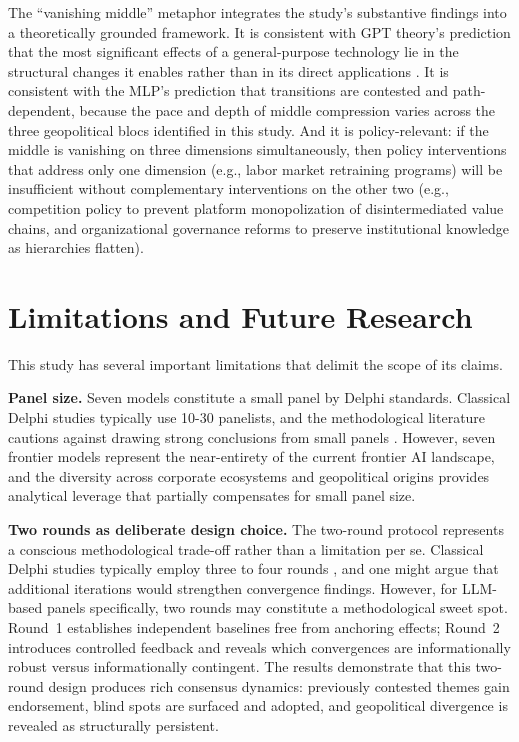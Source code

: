\documentclass[preprint,review,12pt]{elsarticle}
\begin{document}
The ``vanishing middle'' metaphor integrates the study's substantive findings into a theoretically grounded framework. It is consistent with GPT theory's prediction that the most significant effects of a general-purpose technology lie in the structural changes it enables rather than in its direct applications \citep{bresnahan1995gpt}. It is consistent with the MLP's prediction that transitions are contested and path-dependent, because the pace and depth of middle compression varies across the three geopolitical blocs identified in this study. And it is policy-relevant: if the middle is vanishing on three dimensions simultaneously, then policy interventions that address only one dimension (e.g., labor market retraining programs) will be insufficient without complementary interventions on the other two (e.g., competition policy to prevent platform monopolization of disintermediated value chains, and organizational governance reforms to preserve institutional knowledge as hierarchies flatten).



\section{Limitations and Future Research}
\label{sec:limitations}

This study has several important limitations that delimit the scope of its claims.

\textbf{Panel size.} Seven models constitute a small panel by Delphi standards. Classical Delphi studies typically use 10-30 panelists, and the methodological literature cautions against drawing strong conclusions from small panels \citep{vondergracht2012delphi}. However, seven frontier models represent the near-entirety of the current frontier AI landscape, and the diversity across corporate ecosystems and geopolitical origins provides analytical leverage that partially compensates for small panel size.

\textbf{Two rounds as deliberate design choice.} The two-round protocol represents a conscious methodological trade-off rather than a limitation per se. Classical Delphi studies typically employ three to four rounds \citep{linstone1975delphi}, and one might argue that additional iterations would strengthen convergence findings. However, for LLM-based panels specifically, two rounds may constitute a methodological sweet spot. Round~1 establishes independent baselines free from anchoring effects; Round~2 introduces controlled feedback and reveals which convergences are informationally robust versus informationally contingent. The results demonstrate that this two-round design produces rich consensus dynamics: previously contested themes gain endorsement, blind spots are surfaced and adopted, and geopolitical divergence is revealed as structurally persistent.
\end{document}

